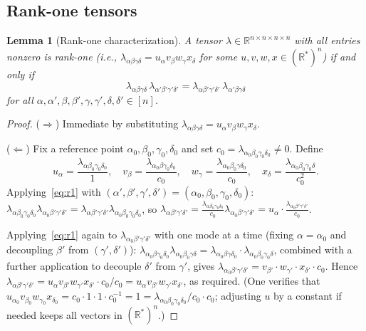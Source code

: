 \documentclass[12pt]{article}
\newtheorem{lemma}[theorem]{Lemma}
\newcommand{\R}{\mathbb{R}}
\begin{document}
\subsection{Rank-one tensors}

\begin{lemma}[Rank-one characterization]\label{lem:rankone}
A tensor $\lambda\in\R^{n\times n\times n\times n}$ with all entries nonzero is rank-one
(i.e., $\lambda_{\alpha\beta\gamma\delta}=u_\alpha v_\beta w_\gamma x_\delta$ for some
$u,v,w,x\in(\R^*)^n$) if and only if
\begin{equation}\label{eq:r1}
  \lambda_{\alpha\beta\gamma\delta}\,\lambda_{\alpha'\beta'\gamma'\delta'}
  = \lambda_{\alpha\beta'\gamma'\delta'}\,\lambda_{\alpha'\beta\gamma\delta}
\end{equation}
for all $\alpha,\alpha',\beta,\beta',\gamma,\gamma',\delta,\delta'\in[n]$.
\end{lemma}

\begin{proof}
($\Rightarrow$) Immediate by substituting $\lambda_{\alpha\beta\gamma\delta}=u_\alpha v_\beta w_\gamma x_\delta$.

($\Leftarrow$) Fix a reference point $\alpha_0,\beta_0,\gamma_0,\delta_0$ and set
$c_0=\lambda_{\alpha_0\beta_0\gamma_0\delta_0}\neq 0$.  Define
\[
  u_\alpha = \frac{\lambda_{\alpha\beta_0\gamma_0\delta_0}}{1},\quad
  v_\beta = \frac{\lambda_{\alpha_0\beta\gamma_0\delta_0}}{c_0},\quad
  w_\gamma = \frac{\lambda_{\alpha_0\beta_0\gamma\delta_0}}{c_0},\quad
  x_\delta = \frac{\lambda_{\alpha_0\beta_0\gamma_0\delta}}{c_0^2}.
\]
Applying~\eqref{eq:r1} with $(\alpha',\beta',\gamma',\delta')=(\alpha_0,\beta_0,\gamma_0,\delta_0)$:
$\lambda_{\alpha\beta_0\gamma_0\delta_0}\lambda_{\alpha_0\beta'\gamma'\delta'}
= \lambda_{\alpha\beta'\gamma'\delta'}\lambda_{\alpha_0\beta_0\gamma_0\delta_0}$, so
$\lambda_{\alpha\beta'\gamma'\delta'}
= \frac{\lambda_{\alpha\beta_0\gamma_0\delta_0}}{c_0}\lambda_{\alpha_0\beta'\gamma'\delta'}
= u_\alpha \cdot \frac{\lambda_{\alpha_0\beta'\gamma'\delta'}}{c_0}$.

Applying~\eqref{eq:r1} again to $\lambda_{\alpha_0\beta'\gamma'\delta'}$ with one mode at a time
(fixing $\alpha=\alpha_0$ and decoupling $\beta'$ from $(\gamma',\delta')$):
$\lambda_{\alpha_0\beta\gamma_0\delta_0}\lambda_{\alpha_0\beta_0\gamma\delta}
= \lambda_{\alpha_0\beta\gamma\delta_0}\cdot\lambda_{\alpha_0\beta_0\gamma_0\delta}$,
combined with a further application to decouple $\delta'$ from $\gamma'$, gives
$\lambda_{\alpha_0\beta'\gamma'\delta'} = v_{\beta'}\cdot w_{\gamma'}\cdot x_{\delta'}\cdot c_0$.
Hence $\lambda_{\alpha\beta'\gamma'\delta'} = u_\alpha v_{\beta'} w_{\gamma'} x_{\delta'}\cdot c_0/c_0
= u_\alpha v_{\beta'}w_{\gamma'}x_{\delta'}$, as required.
(One verifies that $u_{\alpha_0}v_{\beta_0}w_{\gamma_0}x_{\delta_0}
= c_0 \cdot 1\cdot 1\cdot c_0^{-1} = 1 = \lambda_{\alpha_0\beta_0\gamma_0\delta_0}/c_0\cdot c_0$;
adjusting $u$ by a constant if needed keeps all vectors in $(\R^*)^n$.)
\end{proof}
\end{document}
